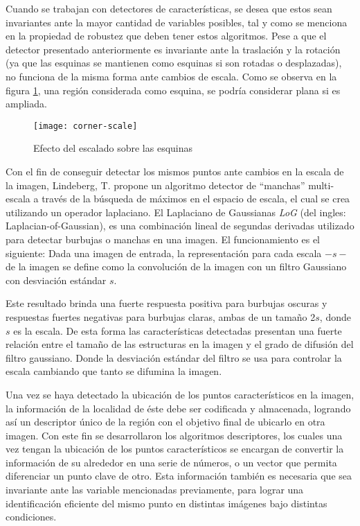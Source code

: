 Cuando se trabajan con detectores de características, se desea que estos sean invariantes ante la mayor cantidad de variables posibles, tal y como se menciona en la propiedad de robustez que deben tener estos algoritmos. Pese a que el detector presentado anteriormente es invariante ante la traslación y la rotación (ya que las esquinas se mantienen como esquinas si son rotadas o desplazadas), no funciona de la misma forma ante cambios de escala. Como se observa en la figura \ref{imagen:corner-scale}, una región considerada como esquina, se podría considerar plana si es ampliada.

\begin{figure}[H]
	\centering
	\texttt{[image: corner-scale]}
	\caption[Efecto del escalado sobre las esquinas]{Efecto del escalado sobre las esquinas	\protect\footnotemark}
	\label{imagen:corner-scale}
\end{figure}

Con el fin de conseguir detectar los mismos puntos ante cambios en la escala de la imagen, Lindeberg, T. \cite{log} propone un algoritmo detector de ``manchas'' multi-escala a través de la búsqueda de máximos en el espacio de escala, el cual se crea utilizando un operador laplaciano. El Laplaciano de Gaussianas \textit{LoG} (del ingles: Laplacian-of-Gaussian), es una combinación lineal de segundas derivadas utilizado para detectar burbujas o manchas en una imagen. El funcionamiento es el siguiente: Dada una imagen de entrada, la representación para cada escala $-s-$ de la imagen se define como la convolución de la imagen con un filtro Gaussiano con desviación estándar $s$.

Este resultado brinda una fuerte respuesta positiva para burbujas oscuras y respuestas fuertes negativas para burbujas claras, ambas de un tamaño 2$s$, donde $s$ es la escala. De esta forma las características detectadas presentan una fuerte relación entre el tamaño de las estructuras en la imagen y el grado de difusión del filtro gaussiano. Donde la desviación estándar del filtro se usa para controlar la escala cambiando que tanto se difumina la imagen.

Una vez se haya detectado la ubicación de los puntos característicos en la imagen, la información de la localidad de éste debe ser codificada y almacenada, logrando así un descriptor único de la región con el objetivo final de ubicarlo en otra imagen. Con este fin se desarrollaron los algoritmos descriptores, los cuales una vez tengan la ubicación de los puntos característicos se encargan de convertir la información de su alrededor en una serie de números, o un vector que permita diferenciar un punto clave de otro. Esta información también es necesaria que sea invariante ante las variable mencionadas previamente, para lograr una identificación eficiente del mismo punto en distintas imágenes bajo distintas condiciones.

